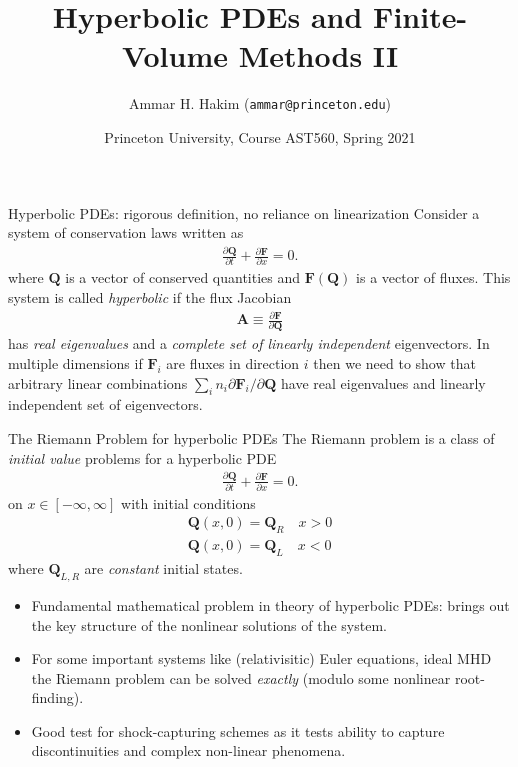 \documentclass[aspectratio=169]{beamer}
\title[{\tt }]{Hyperbolic PDEs and Finite-Volume Methods II}%
\author[https://ast560.rtfd.io]%
{Ammar H. Hakim ({\tt ammar@princeton.edu}) \inst{1}}%
\institute[PPPL]
{ \inst{1} Princeton Plasma Physics Laboratory, Princeton, NJ %
}
\date[3/11/2021]{Princeton University, Course AST560, Spring 2021}
\newcommand{\mypause}{}
\newcommand{\pfrac}[2]{\frac{\partial #1}{\partial #2}}
\newcommand{\mvec}[1]{\mathbf{#1}}
\begin{document}
\begin{frame}[plain]
  \titlepage
\end{frame}

\begin{frame}{Hyperbolic PDEs: rigorous definition, no reliance on
    linearization}
  Consider a system of conservation laws written as
  \begin{align*}
    \pfrac{\mvec{Q}}{t} + \pfrac{\mvec{F}}{x} = 0.
  \end{align*}
  where $\mvec{Q}$ is a vector of conserved quantities and
  $\mvec{F}(\mvec{Q})$ is a vector of fluxes. This system is called
  \emph{hyperbolic} if the flux Jacobian
  \begin{align*}
    \mvec{A} \equiv \pfrac{\mvec{F}}{\mvec{Q}}
  \end{align*}
  has \emph{real eigenvalues} and a \emph{complete set of linearly
    independent} eigenvectors. In multiple dimensions if $\mvec{F}_i$
  are fluxes in direction $i$ then we need to show that arbitrary
  linear combinations
  $\sum_i n_i {\partial\mvec{F}_i}/{\partial\mvec{Q}}$ have real
  eigenvalues and linearly independent set of eigenvectors.
  
\end{frame}

\begin{frame}{The Riemann Problem for hyperbolic PDEs}
  \small%
  The Riemann problem is a class of \emph{initial value} problems for
  a hyperbolic PDE
  \begin{align*}
    \pfrac{\mvec{Q}}{t} + \pfrac{\mvec{F}}{x} = 0.
  \end{align*}
  on $x\in[-\infty,\infty]$ with initial conditions
  \begin{align*}
    \mvec{Q}(x,0) = \mvec{Q}_R \quad x>0 \\
    \mvec{Q}(x,0) = \mvec{Q}_L \quad x<0    
  \end{align*}
  where $\mvec{Q}_{L,R}$ are \emph{constant} initial states.%
  \mypause%
  \begin{itemize}
  \item Fundamental mathematical problem in theory of hyperbolic PDEs:
    brings out the key structure of the nonlinear solutions of the
    system.
  \item For some important systems like (relativisitic) Euler
    equations, ideal MHD the Riemann problem can be solved
    \emph{exactly} (modulo some nonlinear root-finding).
  \item Good test for shock-capturing schemes as it tests ability to
    capture discontinuities and complex non-linear phenomena.
  \end{itemize}
\end{frame}  
\end{document}
